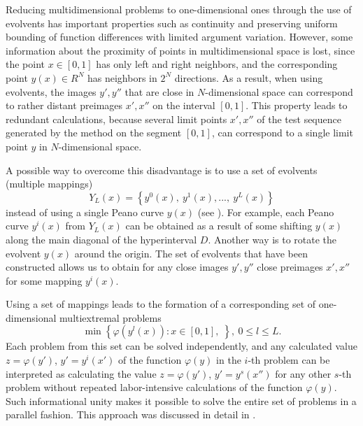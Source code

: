 \documentclass{svproc}
\begin{document}
Reducing multidimensional problems to one-dimensional ones through the use of evolvents has important properties such as continuity and preserving uniform bounding of function differences with limited argument variation. However, some information about the proximity of points in multidimensional space is lost, since the point \(x\in [0,1]\) has only left and right neighbors, and the corresponding point \(y(x) \in R^N\) has neighbors in \(2^N\) directions. As a result, when using evolvents, the images \(y' , y''\) that are close in \(N\)-dimensional space can correspond to rather distant preimages \(x' , x''\) on the interval \([0,1]\). This property leads to redundant calculations, because several limit points \(x' , x''\) of the test sequence generated by the method on the segment \([0,1]\), can correspond to a single limit point \(y\) in \(N\)-dimensional space.

A possible way to overcome this disadvantage is to use a set of evolvents (multiple mappings)
\begin{displaymath}
\label{eq:142}
Y_L(x)=\left\{y^0(x),\ y^1(x),...,\ y^L(x)\right\}
\end{displaymath}
instead of using a single Peano curve \(y(x)\) (see \cite{Strongin1992,Strongin2000}). For example, each Peano curve \(y^i(x)\) from \(Y_L(x)\) can be obtained as a result of some shifting \(y(x)\) along the main diagonal of the hyperinterval \(D\). Another way is to rotate the evolvent \(y(x)\) around the origin. The set of evolvents that have been constructed allows us to obtain for any close images \(y', y''\) close preimages \(x', x''\) for some mapping \(y^i(x)\).

Using a set of mappings leads to the formation of a corresponding set of one-dimensional multiextremal problems
\begin{displaymath}
\label{6_problem_l}
\min{\left\{\varphi(y^l(x)):x\in [0,1], \;  \right\}}, \ 0 \leqslant l \leqslant L.
\end{displaymath}
Each problem from this set can be solved independently, and any calculated value \(z= \varphi(y')\), \(y'=y^i(x')\) of the function \(\varphi(y)\) in the \(i\)-th problem can be interpreted as calculating the value \(z= \varphi(y')\), \(y'=y^s(x'')\) for any other \(s\)-th problem without repeated labor-intensive calculations of the function \(\varphi(y)\). Such informational unity makes it possible to solve the entire set of problems in a parallel fashion. This approach was discussed in detail in \cite{Barkalov2019}.
\end{document}
